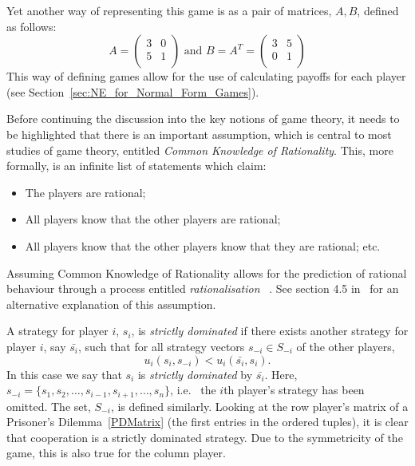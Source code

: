 Yet another way of representing this game is as a pair of matrices, \(A, B\),
defined as follows:
\[
    A = 
    \begin{pmatrix}
       3 & 0\\
       5 & 1\\ 
    \end{pmatrix}
    \text{ and } B = A^{T} =
    \begin{pmatrix}
        3 & 5\\
        0 & 1\\
    \end{pmatrix}
\]
This way of defining games allow for the use of calculating payoffs for each
player (see Section~\ref{sec:NE_for_Normal_Form_Games}).

Before continuing the discussion into the key notions of game theory, it needs
to be highlighted that there is an important assumption, which is central to
most studies of game theory, entitled \textit{Common Knowledge of Rationality}.
This, more formally, is an infinite list of statements which claim:
    \begin{itemize}
        \item The players are rational;
        \item All players know that the other players are rational;
        \item All players know that the other players know that they are 
        rational; etc.    
    \end{itemize}
Assuming Common Knowledge of Rationality allows for the prediction of rational
behaviour through a process entitled \textit{rationalisation}
~\cite{Knight2019}. See section 4.5 in~\cite{maschler_solan_zamir_2013} for an
alternative explanation of this assumption. 


A strategy for player \(i\), \(s_{i}\), is \textit{strictly dominated} if there
exists another strategy for player \(i\), say \(\bar{s_{i}}\), such that for all
strategy vectors \(s_{-i} \in S_{-i}\) of the other players, 
\[
    u_{i}(s_{i}, s_{-i}) < u_{i}(\bar{s_{i}}, s_{i}).
\]
In this case we say that \(s_{i}\) is \textit{strictly dominated} by
\(\bar{s_{i}}\). Here, 
\(s_{-i} = \{s_{1}, s_{2}, \ldots, s_{i-1}, s_{i+1}, \ldots, s_{n}\} \), i.e. \
the \(i\)th player's strategy has been omitted. The 
set, \(S_{-i}\), is defined similarly. Looking at the row player's matrix of a
Prisoner's Dilemma~\ref{PDMatrix} (the first entries in the ordered tuples), it
is clear that cooperation is a strictly dominated strategy. Due to the
symmetricity of the game, this is also true for the column
player.~\cite{maschler_solan_zamir_2013}




